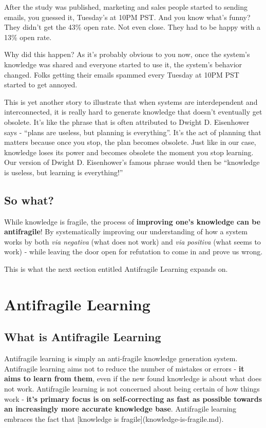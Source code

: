\documentclass{article}
\begin{document}
After the study was published, marketing and sales people started to sending emails, you guessed it, Tuesday's at 10PM PST. And you know what's funny? They didn't get the 43\% open rate. Not even close. They had to be happy with a 13\% open rate. 

Why did this happen? As it's probably obvious to you now, once the system's knowledge was shared and everyone started to use it, the system's behavior changed. Folks getting their emails spammed every Tuesday at 10PM PST started to get annoyed.

This is yet another story to illustrate that when systems are interdependent and interconnected, it is really hard to generate knowledge that doesn't eventually get obsolete. It's like the phrase that is often attributed to Dwight D. Eisenhower says - ``plans are useless, but planning is everything''. It's the act of planning that matters because once you stop, the plan becomes obsolete. Just like in our case, knowledge loses its power and becomes obsolete the moment you stop learning. Our version of Dwight D. Eisenhower's famous phrase would then be ``knowledge is useless, but learning is everything!''

\subsection{So what?}
While knowledge is fragile, the process of \textbf{improving one's knowledge can be antifragile}!
By systematically improving our understanding of how a system works by both \emph{via negativa} (what does not work) and \emph{via positiva} (what seems to work) - while leaving the door open for refutation to come in and prove us wrong.

This is what the next section entitled Antifragile Learning expands on.

\section{Antifragile Learning}

\subsection{What is Antifragile Learning}

Antifragile learning is simply an anti-fragile knowledge generation system. Antifragile learning aims not to reduce the number of mistakes or errors - \textbf{it aims to learn from them}, even if the new found knowledge is about what does not work. Antifragile learning is not concerned about being certain of how things work - \textbf{it's primary focus is on self-correcting as fast as possible towards an increasingly more accurate knowledge base}. Antifragile learning embraces the fact that [knowledge is fragile](knowledge-is-fragile.md).
\end{document}
